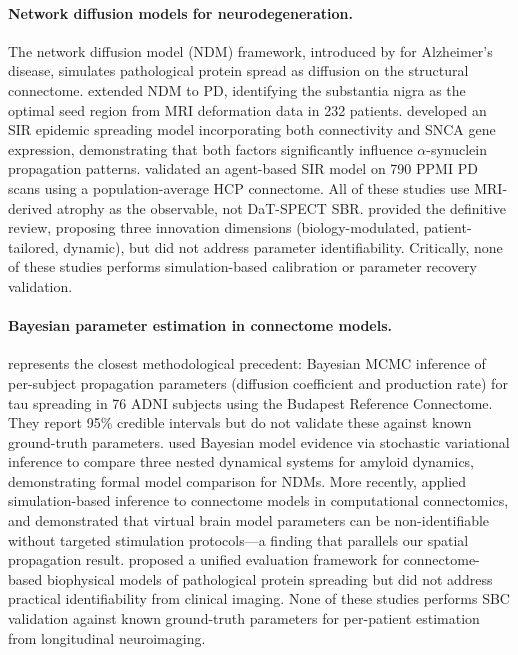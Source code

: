 \paragraph{Network diffusion models for neurodegeneration.}
The network diffusion model (NDM) framework, introduced by \cite{raj2012} for Alzheimer's disease, simulates pathological protein spread as diffusion on the structural connectome. \cite{pandya2019} extended NDM to PD, identifying the substantia nigra as the optimal seed region from MRI deformation data in 232 patients. \cite{zheng2019} developed an SIR epidemic spreading model incorporating both connectivity and SNCA gene expression, demonstrating that both factors significantly influence $\alpha$-synuclein propagation patterns. \cite{abdelgawad2022} validated an agent-based SIR model on 790 PPMI PD scans using a population-average HCP connectome. All of these studies use MRI-derived atrophy as the observable, not DaT-SPECT SBR. \cite{vogel2023} provided the definitive review, proposing three innovation dimensions (biology-modulated, patient-tailored, dynamic), but did not address parameter identifiability. Critically, none of these studies performs simulation-based calibration or parameter recovery validation.

\paragraph{Bayesian parameter estimation in connectome models.}
\cite{schafer2021} represents the closest methodological precedent: Bayesian MCMC inference of per-subject propagation parameters (diffusion coefficient and production rate) for tau spreading in 76 ADNI subjects using the Budapest Reference Connectome. They report 95\% credible intervals but do not validate these against known ground-truth parameters. \cite{garbarino2021} used Bayesian model evidence via stochastic variational inference to compare three nested dynamical systems for amyloid dynamics, demonstrating formal model comparison for NDMs. More recently, \cite{boelts2023} applied simulation-based inference to connectome models in computational connectomics, and \cite{hashemi2024} demonstrated that virtual brain model parameters can be non-identifiable without targeted stimulation protocols---a finding that parallels our spatial propagation result. \cite{ren2025} proposed a unified evaluation framework for connectome-based biophysical models of pathological protein spreading but did not address practical identifiability from clinical imaging. None of these studies performs SBC validation against known ground-truth parameters for per-patient estimation from longitudinal neuroimaging.

